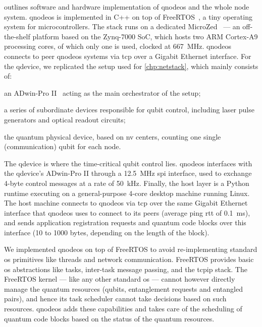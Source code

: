  outlines software and hardware implementation of \acrshort{qnodeos} and
the whole node system. \acrshort{qnodeos} is implemented in C++ on top of FreeRTOS~\cite{freertos},
a tiny operating system for microcontrollers. The stack runs on a dedicated MicroZed~\cite{microzed}
--- an off-the-shelf platform based on the Zynq-7000 SoC, which hosts two ARM Cortex-A9 processing
cores, of which only one is used, clocked at \qty{667}{\MHz}. \acrshort{qnodeos} connects to peer
\acrshort{qnodeos} systems via \acrshort{tcp} over a Gigabit Ethernet interface. For the
\acrshort{qdevice}, we replicated the setup used for \cref{chp:netstack}, which mainly consists of:
%
\begin{inlinelist}
    \item an ADwin-Pro II~\cite{adwin} acting as the main orchestrator of the setup;
    \item a series of subordinate devices responsible for qubit control, including laser pulse
          generators and optical readout circuits;
    \item the quantum physical device, based on \acrshort{nv} centers, counting one single
          (communication) qubit for each node.
\end{inlinelist}
The \acrshort{qdevice} is where the time-critical qubit control lies. \acrshort{qnodeos} interfaces
with the \acrshort{qdevice}'s ADwin-Pro II through a \qty{12.5}{\MHz} \acrshort{spi} interface, used
to exchange 4-byte control messages at a rate of \qty{50}{kHz}. Finally, the host layer is a Python
runtime executing on a general-purpose 4-core desktop machine running Linux. The host machine
connects to \acrshort{qnodeos} via \acrshort{tcp} over the same Gigabit Ethernet interface that
\acrshort{qnodeos} uses to connect to its peers (average ping \acrshort{rtt} of \qty{0.1}{\ms}), and
sends application registration requests and quantum code blocks over this interface (\num{10} to
\num{1000} bytes, depending on the length of the block).

We implemented \acrshort{qnodeos} on top of FreeRTOS to avoid re-implementing standard \acrshort{os}
primitives like threads and network communication. FreeRTOS provides basic \acrshort{os}
abstractions like tasks, inter-task message passing, and the \acrshort{tcpip} stack. The FreeRTOS
kernel --- like any other standard \acrshort{os} --- cannot however directly manage the quantum
resources (qubits, entanglement requests and entangled pairs), and hence its task scheduler cannot
take decisions based on such resources. \acrshort{qnodeos} adds these capabilities and takes care of
the scheduling of quantum code blocks based on the status of the quantum resources.

